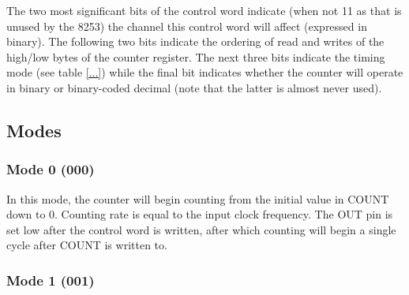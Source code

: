         The two most significant bits of the control word indicate (when not 11 as that is unused by the 8253) the channel this control word will affect (expressed in binary). The following two bits indicate the ordering of read and writes of the high/low bytes of the counter register. The next three bits indicate the timing mode (see table \ref{...}) while the final bit indicates whether the counter will operate in binary or binary-coded decimal (note that the latter is almost never used).

    \subsection{Modes}
        \subsubsection{Mode 0 (000)}
            In this mode, the counter will begin counting from the initial value in COUNT down to 0. Counting rate is equal to the input clock frequency. The OUT pin is set low after the control word is written, after which counting will begin a single cycle after COUNT is written to.

        \subsubsection{Mode 1 (001)}